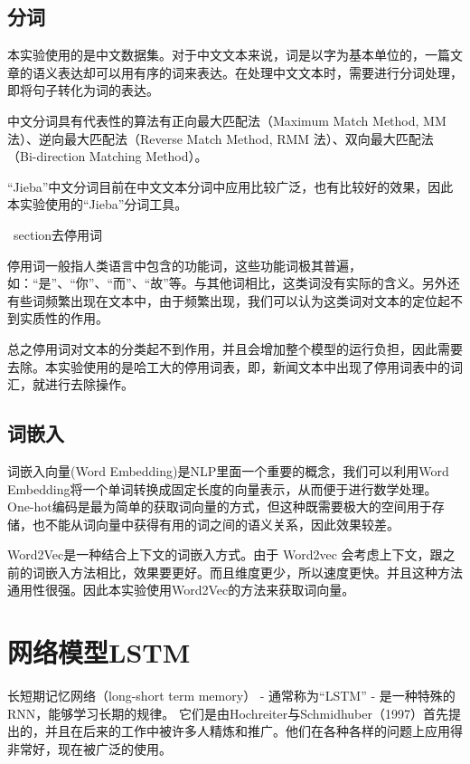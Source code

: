 \documentclass[twocolumn]{ctexart}
\begin{document}
\subsection{分词}
\par 本实验使用的是中文数据集。对于中文文本来说，词是以字为基本单位的，一篇文章的语义表达却可以用有序的词来表达。在处理中文文本时，需要进行分词处理，即将句子转化为词的表达。
\par 中文分词具有代表性的算法有正向最大匹配法（Maximum Match Method, MM 法）、逆向最大匹配法（Reverse Match Method, RMM 法）、双向最大匹配法（Bi-direction Matching Method）。
\par “Jieba”中文分词目前在中文文本分词中应用比较广泛，也有比较好的效果，因此本实验使用的“Jieba”分词工具。

\ section{去停用词}
\par 停用词一般指人类语言中包含的功能词，这些功能词极其普遍，如：“是”、“你”、“而”、“故”等。与其他词相比，这类词没有实际的含义。另外还有些词频繁出现在文本中，由于频繁出现，我们可以认为这类词对文本的定位起不到实质性的作用。

\par 总之停用词对文本的分类起不到作用，并且会增加整个模型的运行负担，因此需要去除。本实验使用的是哈工大的停用词表，即，新闻文本中出现了停用词表中的词汇，就进行去除操作。

\subsection{词嵌入}
\par 词嵌入向量(Word Embedding)是NLP里面一个重要的概念，我们可以利用Word Embedding将一个单词转换成固定长度的向量表示，从而便于进行数学处理。One-hot编码是最为简单的获取词向量的方式，但这种既需要极大的空间用于存储，也不能从词向量中获得有用的词之间的语义关系，因此效果较差。

\par Word2Vec是一种结合上下文的词嵌入方式。由于 Word2vec 会考虑上下文，跟之前的词嵌入方法相比，效果要更好。而且维度更少，所以速度更快。并且这种方法通用性很强。因此本实验使用Word2Vec的方法来获取词向量。

\section{网络模型LSTM}
\par 长短期记忆网络（long-short term memory） - 通常称为“LSTM” - 是一种特殊的RNN，能够学习长期的规律。 它们是由Hochreiter与Schmidhuber（1997）首先提出的，并且在后来的工作中被许多人精炼和推广。他们在各种各样的问题上应用得非常好，现在被广泛的使用。
\end{document}
